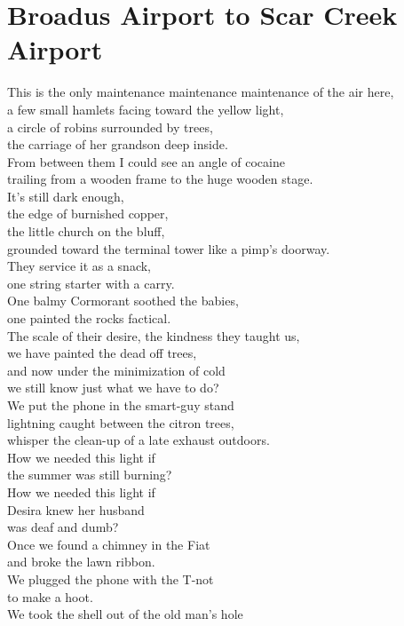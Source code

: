 \documentclass[smalldemyvopaper,11pt,twoside,onecolumn,openright,extrafontsizes]{memoir}
\begin{document}
\chapter{Broadus Airport to Scar Creek Airport}
This is the only maintenance maintenance maintenance of the air here,
\\a few small hamlets facing toward the yellow light,
\\a circle of robins surrounded by trees,
\\the carriage of her grandson deep inside.
\\From between them I could see an angle of cocaine
\\trailing from a wooden frame to the huge wooden stage.
\\It's still dark enough,
\\the edge of burnished copper,
\\the little church on the bluff,
\\grounded toward the terminal tower like a pimp's doorway.
\\They service it as a snack,
\\one string starter with a carry.
\\One balmy Cormorant soothed the babies,
\\one painted the rocks factical.
\\The scale of their desire, the kindness they taught us,
\\we have painted the dead off trees,
\\and now under the minimization of cold
\\we still know just what we have to do?
\\We put the phone in the smart-guy stand
\\lightning caught between the citron trees,
\\whisper the clean-up of a late exhaust outdoors.
\\How we needed this light if
\\the summer was still burning?
\\How we needed this light if
\\Desira knew her husband
\\was deaf and dumb?
\\Once we found a chimney in the Fiat
\\and broke the lawn ribbon.
\\We plugged the phone with the T-not
\\to make a hoot.
\\We took the shell out of the old man's hole
\end{document}
